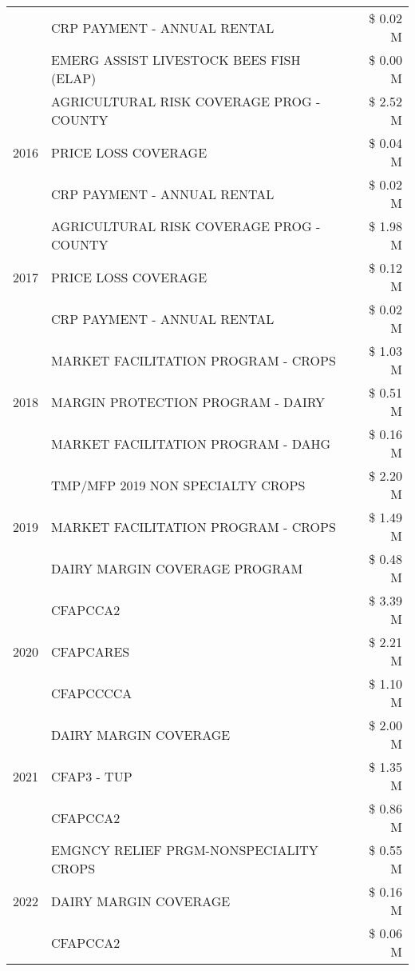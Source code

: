 \begin{tabular}{llr}
 & CRP PAYMENT - ANNUAL RENTAL & \$ 0.02 M \\
 & EMERG ASSIST LIVESTOCK BEES FISH (ELAP) & \$ 0.00 M \\
\cline{1-3}
\multirow[t]{3}{*}{2016} & AGRICULTURAL RISK COVERAGE PROG - COUNTY & \$ 2.52 M \\
 & PRICE LOSS COVERAGE & \$ 0.04 M \\
 & CRP PAYMENT - ANNUAL RENTAL & \$ 0.02 M \\
\cline{1-3}
\multirow[t]{3}{*}{2017} & AGRICULTURAL RISK COVERAGE PROG - COUNTY & \$ 1.98 M \\
 & PRICE LOSS COVERAGE & \$ 0.12 M \\
 & CRP PAYMENT - ANNUAL RENTAL & \$ 0.02 M \\
\cline{1-3}
\multirow[t]{3}{*}{2018} & MARKET FACILITATION PROGRAM - CROPS & \$ 1.03 M \\
 & MARGIN PROTECTION PROGRAM - DAIRY & \$ 0.51 M \\
 & MARKET FACILITATION PROGRAM - DAHG & \$ 0.16 M \\
\cline{1-3}
\multirow[t]{3}{*}{2019} & TMP/MFP 2019 NON SPECIALTY CROPS & \$ 2.20 M \\
 & MARKET FACILITATION PROGRAM - CROPS & \$ 1.49 M \\
 & DAIRY MARGIN COVERAGE PROGRAM & \$ 0.48 M \\
\cline{1-3}
\multirow[t]{3}{*}{2020} & CFAPCCA2 & \$ 3.39 M \\
 & CFAPCARES & \$ 2.21 M \\
 & CFAPCCCCA & \$ 1.10 M \\
\cline{1-3}
\multirow[t]{3}{*}{2021} & DAIRY MARGIN COVERAGE & \$ 2.00 M \\
 & CFAP3 - TUP & \$ 1.35 M \\
 & CFAPCCA2 & \$ 0.86 M \\
\cline{1-3}
\multirow[t]{3}{*}{2022} & EMGNCY RELIEF PRGM-NONSPECIALITY CROPS & \$ 0.55 M \\
 & DAIRY MARGIN COVERAGE & \$ 0.16 M \\
 & CFAPCCA2 & \$ 0.06 M \\
\cline{1-3}
\bottomrule
\end{tabular}
